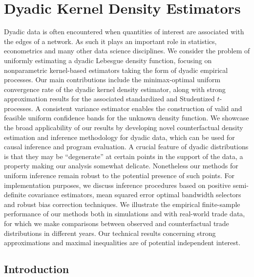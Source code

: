 
\chapter{Dyadic Kernel Density Estimators}
\label{ch:kernel}

Dyadic data is often encountered when quantities of interest are associated
with the edges of a network. As such it plays an important role in statistics,
econometrics and many other data science disciplines. We consider the problem
of uniformly estimating a dyadic Lebesgue density function, focusing on
nonparametric kernel-based estimators taking the form of dyadic empirical
processes. Our main contributions include the minimax-optimal uniform
convergence rate of the dyadic kernel density estimator, along with strong
approximation results for the associated standardized and Studentized
$t$-processes. A consistent variance estimator enables the construction of
valid and feasible uniform confidence bands for the unknown density function.
We showcase the broad applicability of our results by developing novel
counterfactual density estimation and inference methodology for dyadic data,
which can be used for causal inference and program evaluation. A crucial
feature of dyadic distributions is that they may be ``degenerate'' at certain
points in the support of the data, a property making our analysis somewhat
delicate. Nonetheless our methods for uniform inference remain robust to the
potential presence of such points. For implementation purposes, we discuss
inference procedures based on positive semi-definite covariance estimators,
mean squared error optimal bandwidth selectors and robust bias correction
techniques. We illustrate the empirical finite-sample performance of our
methods both in simulations and with real-world trade data, for which we make
comparisons between observed and counterfactual trade distributions in
different years. Our technical results concerning strong approximations and
maximal inequalities are of potential independent interest.

\section{Introduction}
\label{sec:introduction}

